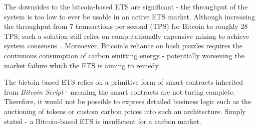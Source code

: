 The downsides to the bitcoin-based ETS are significant - the
throughput of the system is too low to ever be usable in an active
ETS market. Although increasing the throughput from 7 transactions
per second (TPS) for Bitcoin to roughly 28 TPS, such a solution
still relies on computationally expensive mining to achieve
system consensus~\cite{vic15}. Moreoever, Bitcoin's reliance on
hash puzzles requires the continuous consumption of carbon emitting
energy - potentially worsening the market failure which the ETS is aiming to
remedy.

The bictoin-based ETS relies on a primitive form of smart contracts
inherited from \textit{Bitcoin Script} - meaning the smart contracts
are not turing complete. Therefore, it would not be possible to
express detailed business logic such as the auctioning of tokens
or custom carbon prices into such an architecture. Simply stated -
a Bitcoin-based ETS is insufficient for a carbon market.